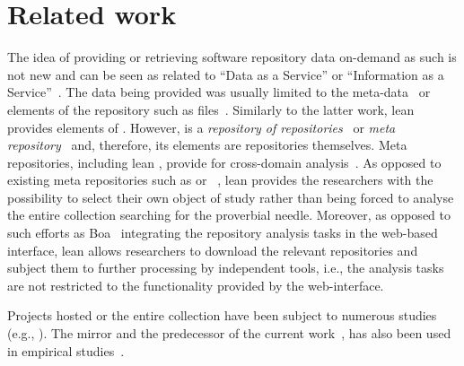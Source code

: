 
\section{Related work}
\label{sec:relwork}

The idea of providing or retrieving software repository data on-demand as such is not new
and can be seen as related to ``Data as a Service'' or ``Information as a Service''~\cite{Dan2007IaaS}.
The data being provided was usually limited to the meta-data~\cite{Codebook} or elements of the
repository such as files~\cite{Voinea2006Mining}.
Similarly to the latter work, lean \ght provides elements of \gh.
However, \gh is a \emph{repository of repositories}~\cite{Sowe2007Using} or
\emph{meta repository}~\cite{Gruhn2013Security} and, therefore, its elements are repositories themselves.
Meta repositories, including lean \ght, provide for cross-domain analysis~\cite{Sowe2007Using}.
As opposed to existing meta repositories such as \ohloh or \flossmole~\cite{Howisom2006FLOSSmole}, 
lean \ght provides the researchers with the possibility to select their own object of study rather than
being forced to analyse the entire collection searching for the proverbial needle.
Moreover, as opposed to such efforts as Boa~\cite{Dyer-Nguyen-Rajan-Nguyen-13} integrating the repository analysis 
tasks in the web-based interface, lean \ght allows researchers to download the relevant repositories
and subject them to further processing by independent tools, i.e., the analysis tasks are not restricted to
the functionality provided by the web-interface.

Projects hosted \gh or the entire \gh collection have been subject to numerous studies (e.g., \cite{allamanis2013mining,dabbish2012social,heller2011visualizing,%
gousios2014exploratory,jiang2013understanding,
lee2013git,marlow2013impression,pham2013creating,
pham2013building,%
schall2013follow,
thung2013network}).
The \gh mirror and the predecessor of the current work~\cite{gousios2012ghtorent},
has also been used in empirical studies~\cite{squire2014forge,vasilescu2013stackoverflow}.

